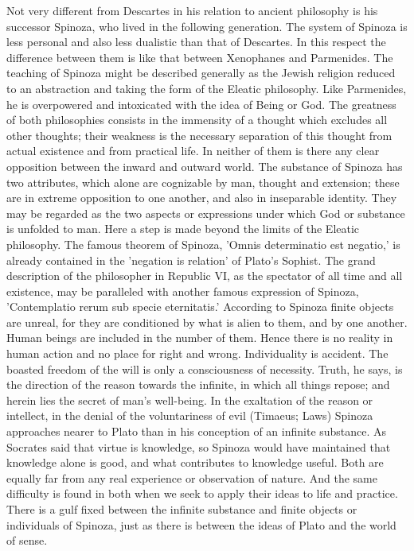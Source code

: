 \documentclass[11pt,letter]{article}
\begin{document}
\par  Not very different from Descartes in his relation to ancient philosophy is his successor Spinoza, who lived in the following generation. The system of Spinoza is less personal and also less dualistic than that of Descartes. In this respect the difference between them is like that between Xenophanes and Parmenides. The teaching of Spinoza might be described generally as the Jewish religion reduced to an abstraction and taking the form of the Eleatic philosophy. Like Parmenides, he is overpowered and intoxicated with the idea of Being or God. The greatness of both philosophies consists in the immensity of a thought which excludes all other thoughts; their weakness is the necessary separation of this thought from actual existence and from practical life. In neither of them is there any clear opposition between the inward and outward world. The substance of Spinoza has two attributes, which alone are cognizable by man, thought and extension; these are in extreme opposition to one another, and also in inseparable identity. They may be regarded as the two aspects or expressions under which God or substance is unfolded to man. Here a step is made beyond the limits of the Eleatic philosophy. The famous theorem of Spinoza, 'Omnis determinatio est negatio,' is already contained in the 'negation is relation' of Plato's Sophist. The grand description of the philosopher in Republic VI, as the spectator of all time and all existence, may be paralleled with another famous expression of Spinoza, 'Contemplatio rerum sub specie eternitatis.' According to Spinoza finite objects are unreal, for they are conditioned by what is alien to them, and by one another. Human beings are included in the number of them. Hence there is no reality in human action and no place for right and wrong. Individuality is accident. The boasted freedom of the will is only a consciousness of necessity. Truth, he says, is the direction of the reason towards the infinite, in which all things repose; and herein lies the secret of man's well-being. In the exaltation of the reason or intellect, in the denial of the voluntariness of evil (Timaeus; Laws) Spinoza approaches nearer to Plato than in his conception of an infinite substance. As Socrates said that virtue is knowledge, so Spinoza would have maintained that knowledge alone is good, and what contributes to knowledge useful. Both are equally far from any real experience or observation of nature. And the same difficulty is found in both when we seek to apply their ideas to life and practice. There is a gulf fixed between the infinite substance and finite objects or individuals of Spinoza, just as there is between the ideas of Plato and the world of sense.
\end{document}
